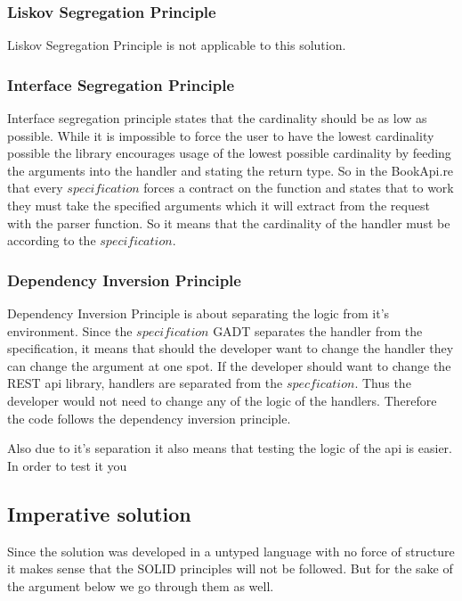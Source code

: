 \subsubsection{Liskov Segregation Principle}

Liskov Segregation Principle is not applicable to this solution.

\subsubsection{Interface Segregation Principle}

Interface segregation principle states that the cardinality should be as low as
possible.  While it is impossible to force the user to have the lowest
cardinality possible the library encourages usage of the lowest possible
cardinality by feeding the arguments into the handler and stating the return
type. So in the BookApi.re that every $specification$ forces a contract on the
function and states that to work they must take the specified arguments which
it will extract from the request with the parser function. So it means that the
cardinality of the handler must be according to the $specification$.

\subsubsection{Dependency Inversion Principle}

Dependency Inversion Principle is about separating the logic from it's
environment.  Since the $specification$ GADT separates the handler from the
specification, it means that should the developer want to change the handler
they can change the argument at one spot. If the developer should want to
change the REST api library, handlers are separated from the
$specfication$. Thus the developer would not need to change any of the logic of
the handlers. Therefore the code follows the dependency inversion principle.

Also due to it's separation it also means that testing the logic of the api 
is easier. In order to test it you 

\subsection{Imperative solution}

Since the solution was developed in a untyped language with no force of
structure it makes sense that the SOLID principles will not be followed. But
for the sake of the argument below we go through them as well.


